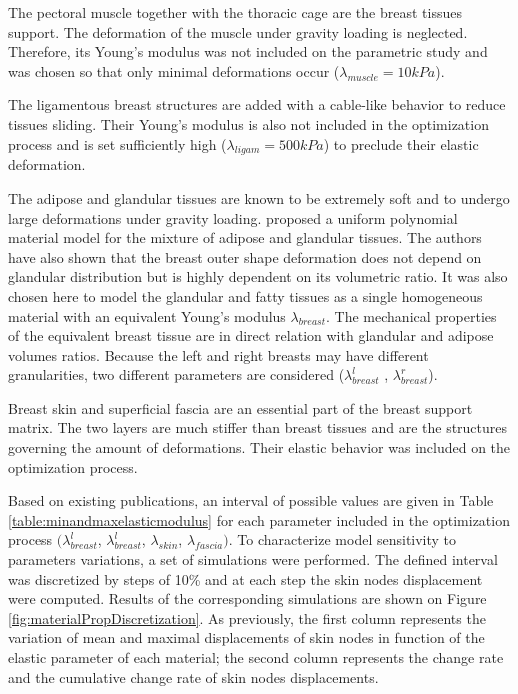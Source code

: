 The pectoral muscle together with the thoracic cage are the breast tissues support. The deformation of the muscle under gravity loading is neglected. Therefore, its Young's modulus was not included on the parametric study and was chosen so that only minimal deformations occur ($\lambda_{muscle}=10kPa$).

The ligamentous breast structures are added with a cable-like behavior to reduce tissues sliding. Their Young's modulus is also not included in the optimization process and is set sufficiently high ($\lambda_{ligam}=500kPa$) to preclude their elastic deformation. 

The adipose and glandular tissues are known to be extremely soft and to undergo large deformations under gravity loading.  \cite{calvo_polynomial_2015} proposed a uniform polynomial material model for the mixture of adipose and glandular tissues. The authors have also shown that the breast outer shape deformation does not depend on glandular distribution but is highly dependent on its volumetric ratio. It was also chosen here to model the glandular and fatty tissues as a single homogeneous material with an equivalent Young's modulus $\lambda_{breast }$. The mechanical properties of the equivalent breast tissue are in direct relation with glandular and adipose volumes ratios. Because the left and right breasts may have different granularities, two different parameters are considered ($\lambda_{breast}^l$ , $\lambda_{breast}^r$).

Breast skin and superficial fascia are an essential part of the breast support matrix. The two layers are much stiffer than breast tissues and are the structures governing the amount of deformations. Their elastic behavior was included on the optimization process.

 Based on existing publications, an interval of possible values are given in Table \ref{table:minandmaxelasticmodulus} for each parameter included in the optimization process $(\lambda_{breast}^l$, $\lambda_{breast}^l$, $\lambda_{skin}$, $\lambda_{fascia})$. To characterize model sensitivity to parameters variations, a set of simulations were performed. The defined interval was discretized by steps of 10\% and at each step the skin nodes displacement were computed. Results of the corresponding simulations are shown on Figure  \ref{fig:materialPropDiscretization}. As previously, the first column represents the variation of mean and maximal displacements of skin nodes in function of the elastic parameter of each material; the second column represents the change rate and the cumulative change rate of skin nodes displacements.


